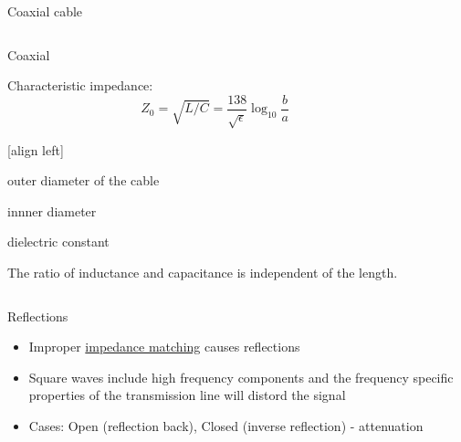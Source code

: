 \documentclass{beamer}
\begin{document}
\begin{frame}[label=coaxial]{Coaxial cable}
\begin{columns}
  \begin{column}{0.48\textwidth}
    Coaxial

    Characteristic impedance:
    \begin{equation*} %
      Z_0 = \sqrt{L/C} = \frac{138}{\sqrt{\epsilon}}\log_{10}{\frac{b}{a}}
    \end{equation*}
    \begin{description}
      [align left]
      \item[$a$] outer diameter of the cable
      \item[$b$] innner diameter
      \item[$\epsilon$] dielectric constant
    \end{description}
    The ratio of inductance and capacitance is independent of the length.
  \end{column}
  \begin{column}{0.48\textwidth}
  \end{column}
\end{columns}
\end{frame}

\begin{frame}{Reflections}
\begin{itemize}
 \item Improper \hyperlink{impedance_matching}{impedance matching} causes reflections
 \item Square waves include high frequency components and
       the frequency specific properties of the transmission line will distord the signal
 \item Cases: Open (reflection back), Closed (inverse reflection) - attenuation
\end{itemize}
\end{frame}
\end{document}
